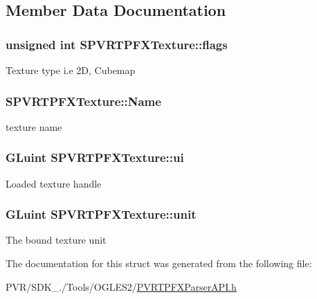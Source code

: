 \subsection{Member Data Documentation}
\hypertarget{struct_s_p_v_r_t_p_f_x_texture_ae1e94f4103dff9c2005375e77e757520}{
\subsubsection[{flags}]{\setlength{\rightskip}{0pt plus 5cm}unsigned int S\+P\+V\+R\+T\+P\+F\+X\+Texture\+::flags}}\label{struct_s_p_v_r_t_p_f_x_texture_ae1e94f4103dff9c2005375e77e757520}
Texture type i.\+e 2\+D, Cubemap \hypertarget{struct_s_p_v_r_t_p_f_x_texture_ab657d187ca89d625681c121aa21608a5}{
\subsubsection[{Name}]{ S\+P\+V\+R\+T\+P\+F\+X\+Texture\+::\+Name}}\label{struct_s_p_v_r_t_p_f_x_texture_ab657d187ca89d625681c121aa21608a5}
texture name \hypertarget{struct_s_p_v_r_t_p_f_x_texture_ae42c124254b7916502bba78f856c95fc}{
\subsubsection[{ui}]{\setlength{\rightskip}{0pt plus 5cm}G\+Luint S\+P\+V\+R\+T\+P\+F\+X\+Texture\+::ui}}\label{struct_s_p_v_r_t_p_f_x_texture_ae42c124254b7916502bba78f856c95fc}
Loaded texture handle \hypertarget{struct_s_p_v_r_t_p_f_x_texture_a304eab91772998aab442b7c0f02535be}{
\subsubsection[{unit}]{\setlength{\rightskip}{0pt plus 5cm}G\+Luint S\+P\+V\+R\+T\+P\+F\+X\+Texture\+::unit}}\label{struct_s_p_v_r_t_p_f_x_texture_a304eab91772998aab442b7c0f02535be}
The bound texture unit 

The documentation for this struct was generated from the following file\+:\begin{DoxyCompactItemize}
\item 
P\+V\+R/\+S\+D\+K\+\_./\+Tools/\+O\+G\+L\+E\+S2/\hyperlink{_p_v_r_t_p_f_x_parser_a_p_i_8h}{P\+V\+R\+T\+P\+F\+X\+Parser\+A\+P\+I.\+h}\end{DoxyCompactItemize}
